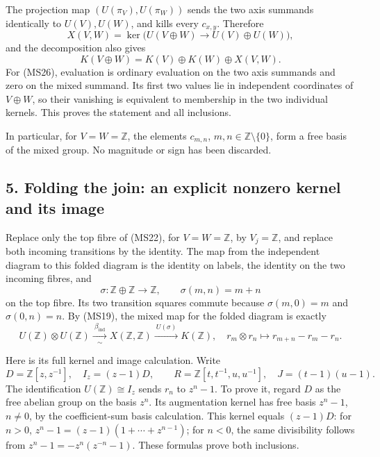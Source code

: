 \documentclass[
]{article}
\begin{document}
The projection map \((U(\pi_V),U(\pi_W))\) sends the two axis summands
identically to \(U(V),U(W)\), and kills every \(c_{x,y}\). Therefore \[
X(V,W)=\ker\bigl(U(V\oplus W)\longrightarrow U(V)\oplus U(W)\bigr),
\tag{MS25}
\] and the decomposition also gives \[
K(V\oplus W)=K(V)\oplus K(W)\oplus X(V,W).
\tag{MS26}
\] For (MS26), evaluation is ordinary evaluation on the two axis
summands and zero on the mixed summand. Its first two values lie in
independent coordinates of \(V\oplus W\), so their vanishing is
equivalent to membership in the two individual kernels. This proves the
statement and all inclusions.

In particular, for \(V=W=\mathbb Z\), the elements \(c_{m,n}\),
\(m,n\in\mathbb Z\setminus\{0\}\), form a free basis of the mixed group.
No magnitude or sign has been discarded.

\subsection{5. Folding the join: an explicit nonzero kernel and its
image}\label{folding-the-join-an-explicit-nonzero-kernel-and-its-image}

Replace only the top fibre of (MS22), for \(V=W=\mathbb Z\), by
\(V_j=\mathbb Z\), and replace both incoming transitions by the
identity. The map from the independent diagram to this folded diagram is
the identity on labels, the identity on the two incoming fibres, and \[
\sigma:\mathbb Z\oplus\mathbb Z\to\mathbb Z,
\qquad \sigma(m,n)=m+n
\tag{MS27}
\] on the top fibre. Its two transition squares commute because
\(\sigma(m,0)=m\) and \(\sigma(0,n)=n\). By (MS19), the mixed map for
the folded diagram is exactly \[
U(\mathbb Z)\otimes U(\mathbb Z)
\xrightarrow[\sim]{\ \beta_{\mathrm{ind}}\ }X(\mathbb Z,\mathbb Z)
\xrightarrow{\ U(\sigma)\ }K(\mathbb Z),
\quad
r_m\otimes r_n\longmapsto r_{m+n}-r_m-r_n.
\tag{MS28}
\]

Here is its full kernel and image calculation. Write \[
D=\mathbb Z[z,z^{-1}],\quad I_z=(z-1)D,
\qquad R=\mathbb Z[t,t^{-1},u,u^{-1}],\quad J=(t-1)(u-1).
\tag{MS29}
\] The identification \(U(\mathbb Z)\cong I_z\) sends \(r_n\) to
\(z^n-1\). To prove it, regard \(D\) as the free abelian group on the
basis \(z^n\). Its augmentation kernel has free basis \(z^n-1\),
\(n\ne0\), by the coefficient-sum basis calculation. This kernel equals
\((z-1)D\): for \(n>0\), \(z^n-1=(z-1)(1+\cdots+z^{n-1})\); for \(n<0\),
the same divisibility follows from \(z^n-1=-z^n(z^{-n}-1)\). These
formulas prove both inclusions.
\end{document}
